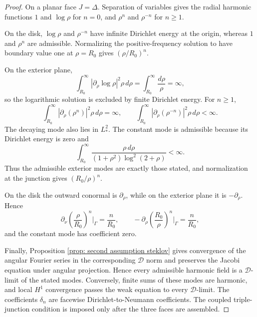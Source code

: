 \documentclass[11pt,twoside]{amsart}
\numberwithin{equation}{section}
\begin{document}
\begin{proof}
On a planar face $J=\Delta$. Separation of variables gives the radial harmonic functions $1$ and $\log\rho$ for $n=0$, and $\rho^n$ and $\rho^{-n}$ for $n\ge1$.

On the disk, $\log\rho$ and $\rho^{-n}$ have infinite Dirichlet energy at the origin, whereas $1$ and $\rho^n$ are admissible. Normalizing the positive-frequency solution to have boundary value one at $\rho=R_0$ gives $(\rho/R_0)^n$.

On the exterior plane,
\[
\int_{R_0}^\infty|\partial_\rho\log\rho|^2\rho\,d\rho
=\int_{R_0}^\infty\frac{d\rho}{\rho}=\infty,
\]
so the logarithmic solution is excluded by finite Dirichlet energy. For $n\ge1$,
\[
\int_{R_0}^\infty|\partial_\rho(\rho^n)|^2\rho\,d\rho=\infty,
\qquad
\int_{R_0}^\infty|\partial_\rho(\rho^{-n})|^2\rho\,d\rho<\infty.
\]
The decaying mode also lies in $L_*^2$. The constant mode is admissible because its Dirichlet energy is zero and
\[
\int_{R_0}^\infty
\frac{\rho\,d\rho}{(1+\rho^2)\log^2(2+\rho)}<\infty.
\]
Thus the admissible exterior modes are exactly those stated, and normalization at the junction gives $(R_0/\rho)^n$.

On the disk the outward conormal is $\partial_\rho$, while on the exterior plane it is $-\partial_\rho$. Hence
\[
\partial_\nu\left(\frac{\rho}{R_0}\right)^n\Big|_\Gamma
=\frac n{R_0},
\qquad
-\partial_\rho\left(\frac{R_0}{\rho}\right)^n\Big|_\Gamma
=\frac n{R_0},
\]
and the constant mode has coefficient zero.

Finally, Proposition \ref{prop: second assumption steklov} gives convergence of the angular Fourier series in the corresponding $\mathcal D$ norm and preserves the Jacobi equation under angular projection. Hence every admissible harmonic field is a $\mathcal D$-limit of the stated modes. Conversely, finite sums of these modes are harmonic, and local $H^1$ convergence passes the weak equation to every $\mathcal D$-limit. The coefficients $\delta_n$ are facewise Dirichlet-to-Neumann coefficients. The coupled triple-junction condition is imposed only after the three faces are assembled.
\end{proof}
\end{document}

